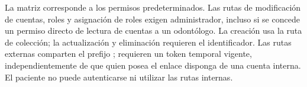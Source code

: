 La matriz corresponde a los permisos predeterminados. Las rutas de modificación
de cuentas, roles y asignación de roles exigen administrador, incluso si se
concede un permiso directo de lectura de cuentas a un odontólogo. La creación
usa la ruta de colección; la actualización y eliminación requieren el
identificador. Las rutas externas comparten el prefijo
; requieren un token temporal vigente,
independientemente de que quien posea el enlace disponga de una cuenta interna.
El paciente no puede autenticarse ni utilizar las rutas internas.
